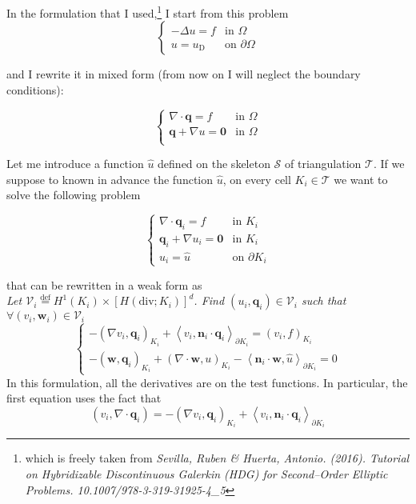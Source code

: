 \documentclass[a4paper,12pt]{article}
\newcommand{\Def}{\stackrel{\mathrm{def}}{=}}
\newcommand{\diver}[1]{\ensuremath{\nabla \cdot #1}}
\newcommand{\uu}{u}
\newcommand{\q}{\mathbf{q}}
\newcommand{\skeleton}{\mathcal{S}}
\newcommand{\triangulation}{\mathcal{T}}
\begin{document}
In the formulation that I used,\footnote{
  which is freely taken from { \it Sevilla, Ruben \& Huerta, Antonio. (2016). Tutorial on 
Hybridizable   Discontinuous Galerkin (HDG) for Second--Order Elliptic Problems. 
10.1007/978-3-319-31925-4\_5}
}
I start from this problem 
\[ 
   \begin{cases}
      - \Delta \uu = f         & \mbox{in } \Omega \\
      \uu = \uu_{\mathrm{D}}     & \mbox{on } \partial \Omega
   \end{cases}
\]

and I rewrite it in mixed form (from now on I will neglect the boundary conditions):

  \[
    \begin{cases}
      \diver{\q} = f                 & \mbox{in } \Omega \\
      \q + \nabla \uu = \mathbf{0}    & \mbox{in } \Omega \\
    \end{cases}
  \]
  
Let me introduce a function $\hat{\uu}$ defined on the skeleton $\skeleton$ of  
triangulation $\mathcal{T}$. If we suppose to known in advance the function $\hat{\uu}$, on every 
cell $K_i \in \triangulation$ we want to solve the following problem

      \[
      \begin{cases}
       \diver{\q}_i = f                  & \mbox{in } K_i  \\      
       \q_i + \nabla \uu_i = \mathbf{0}     & \mbox{in } K_i \\
       \uu_i = \hat{\uu}           & \mbox{on } \partial K_i
      \end{cases}
    \]
  
that can be rewritten in a weak form as \\
{  \it Let $\mathcal{V}_i \Def H^1(K_i) \times \left[H(\mathrm{div}; K_i)\right]^d$. Find $(\uu_i, 
    \q_i) \in \mathcal{V}_i$ such that $\forall (v_i, \mathbf{w}_i) \in \mathcal{V}_i$ }
  \[
   \begin{cases}
      -\left(\nabla v_i, \q_i\right)_{K_i} + \left<v_i, \mathbf{n}_i \cdot 
          \q_i\right>_{\partial K_i} = \left(v_i, f\right)_{K_i} \\
      -\left(\mathbf{w}, \q_i\right)_{K_i} \! + \left(\diver{\mathbf{w}},\uu 
          \right)_{K_i} \! -  \left<\mathbf{n}_i \cdot \mathbf{w}, \hat{\uu}
          \right>_{\partial K_i} = 0
    \end{cases}
  \]
In this formulation, all the derivatives are on the test functions. In particular, the first 
equation uses the fact that
\[ \left(v_i, \diver{\q_i} \right) = -\left(\nabla v_i, \q_i\right)_{K_i} + \left<v_i, \mathbf{n}_i 
    \cdot \q_i\right>_{\partial K_i}  \]
  
\end{document}

